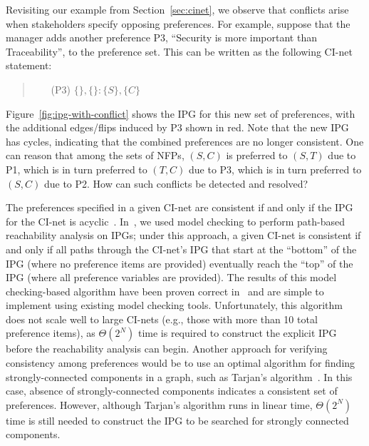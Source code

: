 Revisiting our example from Section~\ref{sec:cinet}, we observe that 
conflicts arise when stakeholders specify opposing preferences. For
example, suppose that the manager adds another preference P3,
``Security is more important than Traceability'', to the preference set. 
This can be written as the following CI-net statement:
\begin{quote}
\begin{enumerate}
	\item[(P3)] $\{\}, \{\} : \{S\}, \{C\}$
\end{enumerate}
\end{quote}
Figure~\ref{fig:ipg-with-conflict} shows the IPG for this new set of preferences, with the additional 
edges/flips induced by P3 shown in red. Note that the
new IPG has cycles, indicating that the combined preferences are no longer consistent. 
One can reason that among the sets of NFPs, $(S,C)$ is preferred to $(S,T)$
due to P1, which is in turn preferred to $(T,C)$ due to P3, which is in turn preferred
to $(S,C)$ due to P2. How can such conflicts be detected and resolved?


The preferences specified in a given CI-net are consistent if and only if the IPG for the CI-net is acyclic~\cite{Bouveret:IJCAI2009}. In~\cite{Santhanam:AAAI2010}, we used model checking to perform path-based reachability analysis on IPGs; under this approach, a given CI-net is consistent if and only if all paths through the CI-net's IPG that start at the ``bottom'' of the IPG (where no preference items are provided) eventually reach the ``top'' of the IPG (where all preference variables are provided). The results of this model checking-based algorithm have been proven correct in~\cite{Santhanam:AAAI2010} and are simple to implement using existing model checking tools. Unfortunately, this algorithm does not scale well to large CI-nets (e.g., those with more than 10 total preference items), as $\Theta(2^N)$ time is required to construct the explicit IPG before the reachability analysis can begin. Another approach for verifying consistency among preferences would be to use an optimal algorithm for finding strongly-connected components in a graph, such as Tarjan's algorithm~\cite{Tarjan:DFS}. In this case, absence of strongly-connected components indicates a consistent set of preferences. However, although Tarjan's algorithm runs in linear time, $\Theta(2^N)$ time is still needed to construct the IPG to be searched for strongly connected components.

